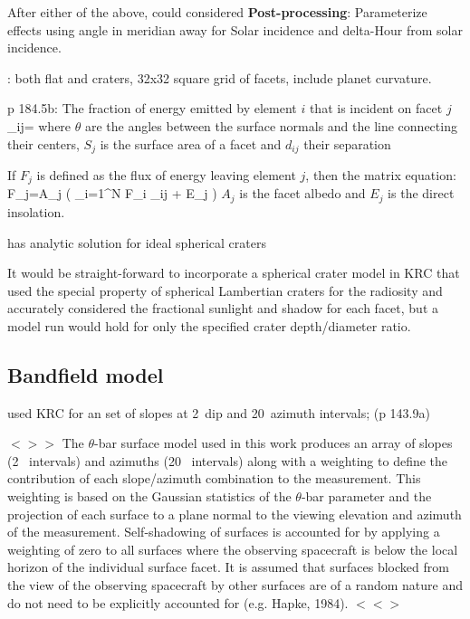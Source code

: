 \documentclass{article}
\newcommand{\bq}{$ < \! > \!   \! >$ } %
\newcommand{\eq}{ $< \! \! < \! > $ } %
\begin{document}
After either of the above, could considered \textbf{Post-processing}:
Parameterize effects using angle in meridian away for Solar incidence and
delta-Hour from solar incidence.

: both flat and craters, 32x32 square grid of facets,
 include planet curvature. 

p 184.5b: The fraction of energy emitted by element $i$ that is incident on
facet $j$ 
\qbn \alpha_{ij}= \qen 
where $\theta$ are the angles between the surface normals and the line
connecting their centers, $S_j$ is the surface area of a facet and $d_{ij}$
their separation

If $F_j$ is defined as the flux of energy leaving element $j$, then the matrix equation:
\qb F_j=A_j \left( \sum_{i=1}^N F_i \alpha_{ij} + E_j \right) \qe
$A_j$ is the facet albedo and $E_j$ is the direct insolation.

 has analytic solution for ideal spherical craters

It would be straight-forward to incorporate a spherical crater model in KRC that
used the special property of spherical Lambertian craters for the radiosity and
accurately considered the fractional sunlight and shadow for each facet, but a
model run would hold for only the specified crater depth/diameter ratio.

\subsection{Bandfield model}

 used KRC for an set of slopes at 2\qd ~dip and 20\qd ~azimuth intervals; (p 143.9a)

\bq The $\theta$-bar surface model used in this work produces an array of slopes
(2\qd~ intervals) and azimuths (20\qd~ intervals) along with a weighting to
define the contribution of each slope/azimuth combination to the
measurement. This weighting is based on the Gaussian statistics of the
$\theta$-bar parameter and the projection of each surface to a plane normal to
the viewing elevation and azimuth of the measurement. Self-shadowing of surfaces
is accounted for by applying a weighting of zero to all surfaces where the
observing spacecraft is below the local horizon of the individual surface
facet. It is assumed that surfaces blocked from the view of the observing
spacecraft by other surfaces are of a random nature and do not need to be
explicitly accounted for (e.g. Hapke, 1984). \eq
\end{document}
